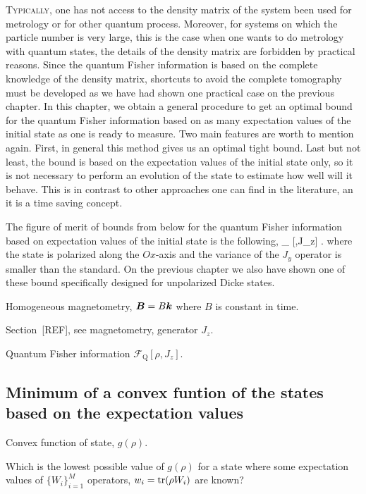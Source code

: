 \lettrine[lines=2, findent=3pt,nindent=0pt]{T}{ypically}, one has not access to the density matrix of the system been used for metrology or for other quantum process.
Moreover, for systems on which the particle number is very large, this is the case when one wants to do metrology with quantum states, the details of the density matrix are forbidden by practical reasons.
Since the quantum Fisher information is based on the complete knowledge of the density matrix, shortcuts to avoid the complete tomography must be developed as we have had shown one practical case on the previous chapter.
In this chapter, we obtain a general procedure to get an optimal bound for the quantum Fisher information based on as many expectation values of the initial state as one is ready to measure.
Two main features are worth to mention again.
First, in general this method gives us an optimal tight bound.
Last but not least, the bound is based on the expectation values of the initial state only, so it is not necessary to perform an evolution of the state to estimate how well will it behave.
This is in contrast to other approaches one can find in the literature, an it is a time saving concept.

The figure of merit of bounds from below for the quantum Fisher information based on expectation values of the initial state is the following,
\be
  _{} [\rho,J_z] \geq {}.
\ee
where the state is polarized along the $Ox$-axis and the variance of the $J_y$ operator is smaller than the standard.
On the previous chapter we also have shown one of these bound specifically designed for unpolarized Dicke states.

Homogeneous magnetometry, $\boldsymbol{B} = B\boldsymbol{k}$ where $B$ is constant in time.

Section~[REF], see magnetometry, generator $J_z$.

Quantum Fisher information $\mathcal{F}_{\text{Q}} [\rho, J_z]$.

\subsection{Minimum of a convex funtion of the states based on the expectation values}

Convex function of state, $g(\rho)$.

Which is the lowest possible value of $g(\rho)$ for a state where some expectation values of $\{W_{i}\}_{i=1}^M$ operators, $w_i = \operatorname{tr}(\rho {W}_i)$ are known?

